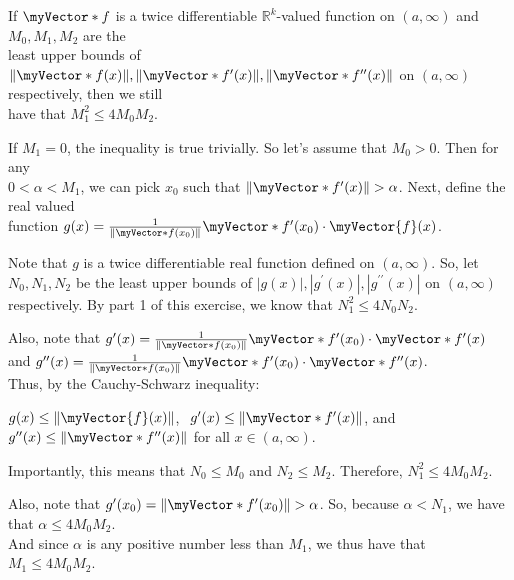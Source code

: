 \documentclass{book}
\newcommand{\pracTwo}{
   \color{Orange}%
   \fontsize{12}{14}\selectfont%
}
\newenvironment{myIndent}{%
   \begin{adjustwidth}{2.5em}{0em}%
}{%
   \end{adjustwidth}%
}
\newcommand{\pprime}{{\prime\prime}}
\newcommand{\retTwo}{\hfill\bigbreak}
\newcommand{\mVec}[1]{\myVector{#1}}
\newcommand{\mVecAst}[1]{\myVector*{#1}}
\begin{document}
If $\mVecAst{f}$ is a twice differentiable $\mathbb{R}^k$-valued function on $(a, \infty)$ and $M_0, M_1, M_2$ are the\\ least upper bounds of $\|\mVecAst{f}(x)\|, \|\mVecAst{f}^\prime(x)\|, \|\mVecAst{f}^\pprime(x)\|$ on $(a, \infty)$ respectively, then we still\\ [2pt] have that $M_1^2 \leq 4M_0M_2$.\\ [-6pt]

{\begin{myIndent}\pracTwo
   If $M_1 = 0$, the inequality is true trivially. So let's assume that $M_0 > 0$. Then for any\\ $0 < \alpha < M_1$, we can pick $x_0$ such that $\|\mVecAst{f}^\prime(x)\| > \alpha$. Next, define the real valued\\ function $g(x) = \frac{1}{\|\mVecAst{f}(x_0)\|}\mVecAst{f}^\prime(x_0) \cdot \mVec{f}(x)$.\retTwo

   Note that $g$ is a twice differentiable real function defined on $(a, \infty)$. So, let\\ $N_0, N_1, N_2$ be the least upper bounds of $|g(x)|, |g^\prime(x)|, |g^\pprime(x)|$ on $(a, \infty)$\\ respectively. By part 1 of this exercise, we know that $N_1^2 \leq 4N_0N_2$.\retTwo

   Also, note that $g^\prime(x) = \frac{1}{\|\mVecAst{f}(x_0)\|}\mVecAst{f}^\prime(x_0) \cdot \mVecAst{f}^\prime(x)$ and $g^\pprime(x) = \frac{1}{\|\mVecAst{f}(x_0)\|}\mVecAst{f}^\prime(x_0) \cdot \mVecAst{f}^\pprime(x)$.\\ Thus, by the Cauchy-Schwarz inequality:
   
   {\centering $g(x) \leq \|\mVec{f}(x)\|$, $\hspace{0.4em}g^\prime(x) \leq \|\mVecAst{f}^\prime(x)\|$,\hspace{0.4em} and $g^\pprime(x) \leq \|\mVecAst{f}^\pprime(x)\|$ for all $x \in (a, \infty)$.\retTwo\par}

   Importantly, this means that $N_0 \leq M_0$ and $N_2 \leq M_2$. Therefore, $N_1^2 \leq 4M_0M_2$.\retTwo

   Also, note that $g^\prime(x_0) = \|\mVecAst{f}^\prime(x_0)\| > \alpha$. So, because $\alpha < N_1$, we have that $\alpha \leq 4M_0M_2$.\\ And since $\alpha$ is any positive number less than $M_1$, we thus have that $M_1 \leq 4M_0M_2$.
\end{myIndent}}
\end{document}
